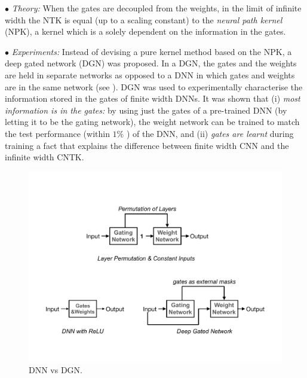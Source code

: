 $\bullet$ \emph{Theory:} When the gates are decoupled from the weights, in the limit of infinite width the NTK is equal (up to a scaling constant) to the \emph{neural path kernel} (NPK),  a kernel which is a solely dependent on the information in the gates. %

$\bullet$ \emph{Experiments:} Instead of devising a pure kernel method based on the NPK, a deep gated network (DGN) was proposed. In a DGN, the gates and the weights are held in separate networks as opposed to a DNN in which gates and weights are in the same network (see ).  DGN was used to experimentally characterise the information stored in the gates of finite width DNNs. It was shown that (i)  \emph{most information is in the gates:} by using just the gates of a pre-trained DNN (by letting it to be the gating network), the weight network can be trained to match the test performance (within $1\%$ ) of the DNN, and (ii) \emph{gates are learnt} during training a fact that explains the difference between finite width CNN and the infinite width CNTK.  
\FloatBarrier
\begin{figure}[h]
\centering
\includegraphics[scale=0.22]{figs/dnn-dgn.pdf}
\caption{DNN vs DGN.}
\label{fig:dgn}
\end{figure}

